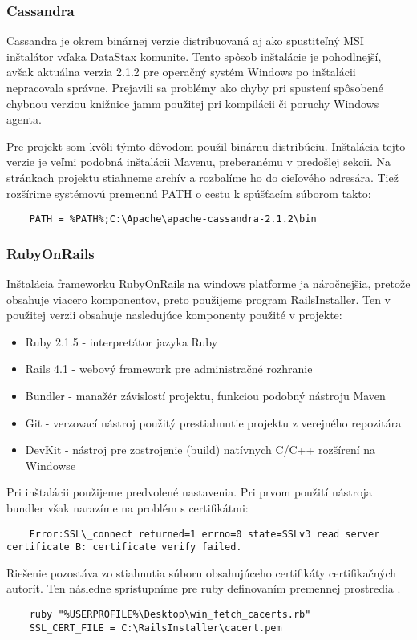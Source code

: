 \subsubsection{Cassandra}	%
	Cassandra je okrem binárnej verzie distribuovaná aj ako spustiteľný MSI inštalátor vďaka DataStax komunite. Tento spôsob inštalácie je pohodlnejší, avšak aktuálna verzia 2.1.2 pre operačný systém Windows po inštalácii nepracovala správne. Prejavili sa problémy ako chyby pri spustení spôsobené chybnou verziou knižnice jamm použitej pri kompilácii či poruchy Windows agenta.
		
	Pre projekt som kvôli týmto dôvodom použil binárnu distribúciu. Inštalácia tejto verzie je veľmi podobná inštalácii Mavenu, preberanému v predošlej sekcii. Na stránkach projektu stiahneme archív a rozbalíme ho do cieľového adresára. Tiež rozšírime systémovú premennú PATH o cestu k spúšťacím súborom takto:
	\begin{lstlisting}
	PATH = %PATH%;C:\Apache\apache-cassandra-2.1.2\bin
	\end{lstlisting}
	

\subsubsection{RubyOnRails}	%
	Inštalácia frameworku RubyOnRails na windows platforme ja náročnejšia, pretože obsahuje viacero komponentov, preto použijeme program RailsInstaller. Ten v použitej verzii obsahuje nasledujúce komponenty použité v projekte:
	\begin{itemize}
		\item Ruby 2.1.5 - interpretátor jazyka Ruby
		\item Rails 4.1 - webový framework pre administračné rozhranie
		\item Bundler - manažér závislostí projektu, funkciou podobný nástroju Maven
		\item Git - verzovací nástroj použitý prestiahnutie projektu z verejného repozitára
		\item DevKit - nástroj pre zostrojenie (build) natívnych C/C++ rozšírení na Windowse
	\end{itemize}

	Pri inštalácii použijeme predvolené nastavenia. Pri prvom použití nástroja bundler však narazíme na problém s certifikátmi:
	\begin{lstlisting}
	Error:SSL\_connect returned=1 errno=0 state=SSLv3 read server certificate B: certificate verify failed.
	\end{lstlisting}
	Riešenie pozostáva zo stiahnutia súboru obsahujúceho certifikáty certifikačných autorít. Ten následne sprístupníme pre ruby definovaním premennej prostredia \cite{web:certificate-fix}.
	\begin{lstlisting}
	ruby "%USERPROFILE%\Desktop\win_fetch_cacerts.rb"
	SSL_CERT_FILE = C:\RailsInstaller\cacert.pem
	\end{lstlisting}
		
